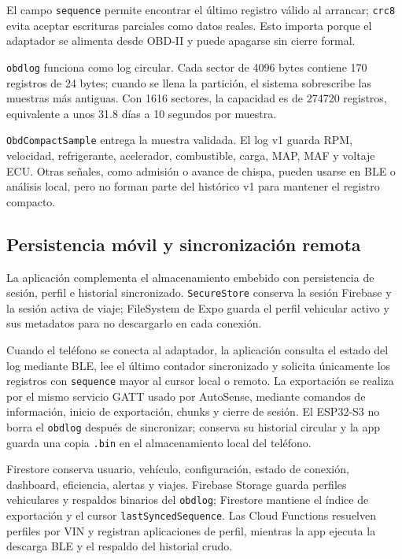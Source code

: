 \documentclass[12pt,letterpaper]{report}
\begin{document}
El campo \texttt{sequence} permite encontrar el último registro válido al arrancar; \texttt{crc8} evita aceptar escrituras parciales como datos reales. Esto importa porque el adaptador se alimenta desde OBD-II y puede apagarse sin cierre formal.

\texttt{obdlog} funciona como log circular. Cada sector de 4096 bytes contiene 170 registros de 24 bytes; cuando se llena la partición, el sistema sobrescribe las muestras más antiguas. Con 1616 sectores, la capacidad es de 274720 registros, equivalente a unos 31.8 días a 10 segundos por muestra.

\texttt{ObdCompactSample} entrega la muestra validada. El log v1 guarda RPM, velocidad, refrigerante, acelerador, combustible, carga, MAP, MAF y voltaje ECU. Otras señales, como admisión o avance de chispa, pueden usarse en BLE o análisis local, pero no forman parte del histórico v1 para mantener el registro compacto.

\subsection{Persistencia móvil y sincronización remota}

La aplicación complementa el almacenamiento embebido con persistencia de sesión, perfil e historial sincronizado. \texttt{SecureStore} conserva la sesión Firebase y la sesión activa de viaje; FileSystem de Expo guarda el perfil vehicular activo y sus metadatos para no descargarlo en cada conexión.

Cuando el teléfono se conecta al adaptador, la aplicación consulta el estado del log mediante BLE, lee el último contador sincronizado y solicita únicamente los registros con \texttt{sequence} mayor al cursor local o remoto. La exportación se realiza por el mismo servicio GATT usado por AutoSense, mediante comandos de información, inicio de exportación, chunks y cierre de sesión. El ESP32-S3 no borra el \texttt{obdlog} después de sincronizar; conserva su historial circular y la app guarda una copia \texttt{.bin} en el almacenamiento local del teléfono.

Firestore conserva usuario, vehículo, configuración, estado de conexión, dashboard, eficiencia, alertas y viajes. Firebase Storage guarda perfiles vehiculares y respaldos binarios del \texttt{obdlog}; Firestore mantiene el índice de exportación y el cursor \texttt{lastSyncedSequence}. Las Cloud Functions resuelven perfiles por VIN y registran aplicaciones de perfil, mientras la app ejecuta la descarga BLE y el respaldo del historial crudo.
\end{document}
